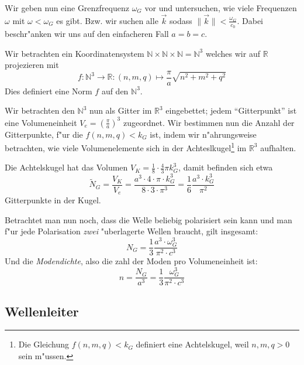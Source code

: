 Wir geben nun eine Grenzfrequenz $\omega_G$ vor und untersuchen, wie
viele Frequenzen $\omega$ mit $\omega < \omega_G$ es gibt. Bzw. wir
suchen alle $\vec k$ sodass $\|\vec k\| < \frac{\omega_G}{c_0}$. Dabei
beschr"anken wir uns auf den einfacheren Fall $a = b = c$.

Wir betrachten ein Koordinatensystem $\mathbb N \times \mathbb N
\times \mathbb N = \mathbb N^3$ welches wir auf $\mathbb R$
projezieren mit
\begin{equation}
   \label{eq:418}
   f : \mathbb N^3 \to \mathbb R : (n,m,q) \mapsto \frac{\pi}{a}
   \sqrt{n^2 + m^2 + q^2}
\end{equation}
Dies definiert eine Norm $f$ auf den $\mathbb N^3$.

Wir betrachten den $\mathbb N^3$ nun als Gitter im $\mathbb R^3$
eingebettet; jedem "`Gitterpunkt"' ist eine Volumeneinheit $V_e =
(\frac{\pi}{a})^3$ zugeordnet. Wir bestimmen nun die Anzahl der
Gitterpunkte, f"ur die $f(n,m,q) < k_G$ ist, indem wir n"ahrungsweise
betrachten, wie viele Volumenelemente sich in der
Achteslkugel\footnote{Die Gleichung $f(n,m,q) < k_G$ definiert eine
  Achtelskugel, weil $n, m, q > 0$ sein m"ussen.} im $\mathbb
R^3$ aufhalten.

Die Achtelskugel hat das Volumen $V_K = \frac{1}{8} \cdot \frac{4}{3} \pi k_G^3$, damit
befinden sich etwa
\begin{equation*}
   \label{eq:419}
   \tilde N_G = \frac{V_K}{V_e} = \frac{a^3 \cdot 4 \cdot \pi \cdot k_G^3}{8
     \cdot 3 \cdot \pi^3} = \frac{1}{6} \frac{a^3 \cdot k_G^3}{\pi^2}
\end{equation*}
Gitterpunkte in der Kugel.

 Betrachtet man nun noch, dass die Welle
beliebig polarisiert sein kann und man f"ur jede Polarisation
\emph{zwei} "uberlagerte Wellen braucht, gilt insgesamt:
\begin{equation}
   \label{eq:420}
   N_G = \frac{1}{3} \frac{a^3 \cdot \omega_G^3}{\pi^2 \cdot  c^3}
\end{equation}
Und die \emph{Modendichte}, also die zahl der Moden pro Volumeneinheit
ist:
\begin{equation}
    \label{eq:421}
    n = \frac{N_G}{a^3} = \frac{1}{3} \frac{ \omega_G^3}{\pi^2 \cdot  c^3}
\end{equation}







\subsection{Wellenleiter}
\label{kap_wellenleiter}

